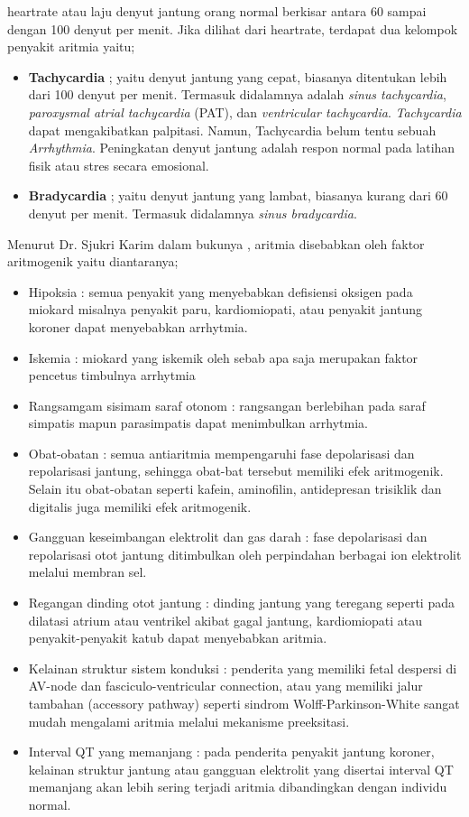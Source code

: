 \Gls{heartrate} atau laju denyut jantung orang normal berkisar
antara 60 sampai dengan 100 denyut per menit\cite{medicinenet.2}. Jika dilihat
dari \gls{heartrate}, terdapat dua kelompok penyakit aritmia yaitu;
\begin{itemize}
	\item \textbf{Tachycardia} ; yaitu denyut jantung yang cepat, biasanya
	ditentukan lebih dari 100 denyut per menit. Termasuk didalamnya adalah 
	\textit{sinus tachycardia}, \textit{paroxysmal atrial tachycardia} (PAT), dan
	\textit{ventricular tachycardia}. \textit{Tachycardia}  dapat mengakibatkan
	\gls{palpitasi}. Namun, Tachycardia belum tentu sebuah 	\textit{Arrhythmia}.
	Peningkatan denyut jantung adalah respon  normal pada latihan fisik atau stres
	secara emosional.

	\item \textbf{Bradycardia} ; yaitu denyut jantung yang lambat, biasanya kurang
	dari 60 denyut per menit. Termasuk didalamnya \textit{sinus bradycardia}.
\end{itemize}
 
Menurut Dr. Sjukri Karim dalam bukunya \cite{Karim:1996}, aritmia
disebabkan oleh faktor aritmogenik yaitu diantaranya;
\begin{itemize}
  \item Hipoksia : semua penyakit yang menyebabkan defisiensi oksigen pada
  miokard misalnya penyakit paru, kardiomiopati, atau penyakit jantung koroner
  dapat menyebabkan \gls{arrhytmia}.
  \item Iskemia : miokard yang iskemik oleh sebab apa saja merupakan faktor
  pencetus timbulnya \gls{arrhytmia}
  \item Rangsamgam sisimam saraf otonom : rangsangan berlebihan pada saraf
  simpatis mapun parasimpatis dapat menimbulkan \gls{arrhytmia}.
  \item Obat-obatan : semua antiaritmia mempengaruhi fase depolarisasi dan
  repolarisasi jantung, sehingga obat-bat tersebut memiliki efek aritmogenik.
  Selain itu obat-obatan seperti kafein, aminofilin, antidepresan trisiklik dan
  digitalis juga memiliki efek aritmogenik.
  \item Gangguan keseimbangan elektrolit dan gas darah : fase depolarisasi dan
  repolarisasi otot jantung ditimbulkan oleh perpindahan berbagai ion elektrolit
  melalui membran sel.
  \item Regangan dinding otot jantung : dinding jantung yang teregang seperti
  pada dilatasi atrium atau ventrikel akibat gagal jantung, kardiomiopati atau
  penyakit-penyakit katub dapat menyebabkan aritmia.
  \item Kelainan struktur sistem konduksi : penderita yang memiliki fetal
  despersi di AV-node dan fasciculo-ventricular connection, atau yang memiliki
  jalur tambahan (accessory pathway) seperti sindrom Wolff-Parkinson-White
  sangat mudah mengalami aritmia melalui mekanisme preeksitasi.
  \item Interval QT yang memanjang : pada penderita penyakit jantung koroner,
  kelainan struktur jantung atau gangguan elektrolit yang disertai interval QT
  memanjang akan lebih sering terjadi aritmia dibandingkan dengan individu
  normal.
\end{itemize} 

